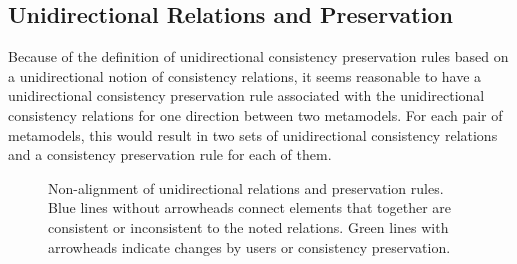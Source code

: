 \subsection{Unidirectional Relations and Preservation}
\label{chap:synchronization:gap:alignment}

Because of the definition of unidirectional consistency preservation rules based on a unidirectional notion of consistency relations, it seems reasonable to have a unidirectional consistency preservation rule associated with the unidirectional consistency relations for one direction between two metamodels.
For each pair of metamodels, this would result in two sets of unidirectional consistency relations and a consistency preservation rule for each of them.

\begin{figure}
    \centering
    
    \caption[Non-alignment of unidirectional relations and preservation]{Non-alignment of unidirectional relations and preservation rules. Blue lines without arrowheads connect elements that together are consistent or inconsistent to the noted relations. Green lines with arrowheads indicate changes by users or consistency preservation.
    }
    \label{fig:synchronization:unidirectional_nonalignment}
\end{figure}

